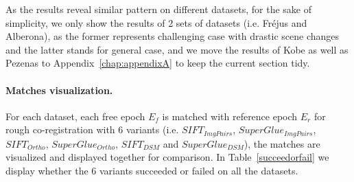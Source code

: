 
As the results reveal similar pattern on different datasets, for the sake of simplicity, we only show the results of 2 sets of datasets (i.e. Fr{\'e}jus and Alberona), as the former represents challenging case with drastic scene changes and the latter stands for general case, and we move the results of Kobe as well as Pezenas to Appendix~\ref{chap:appendixA} to keep the current section tidy.\\

\paragraph{Matches visualization.}
\label{sec:MatchVizMainBody}
For each dataset, each free epoch $E_f$ is matched with reference epoch $E_r$ for rough co-registration with 6 variants (i.e.  $SIFT_{ImgPairs}$,  $SuperGlue_{ImgPairs}$,  $SIFT_{Ortho}$,  $SuperGlue_{Ortho}$,  $SIFT_{DSM}$ and  $SuperGlue_{DSM}$), the matches are visualized and displayed together for comparison. In Table~\ref{succeedorfail} we display whether the 6 variants succeeded or failed on all the datasets.\\


